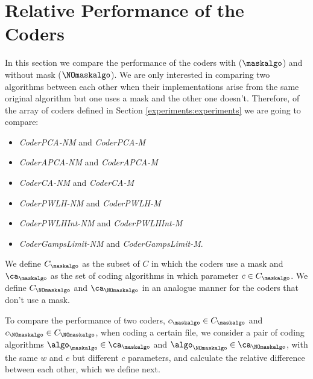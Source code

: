 \clearpage
\section{Relative Performance of the Coders}
\label{secX:rendimiento-relativo}

In this section we compare the performance of the coders with ($\maskalgo$) and without mask ($\NOmaskalgo$). We are only interested in comparing two algorithms between each other when their implementations arise from the same original algorithm but one uses a mask and the other one doesn't. Therefore, of the array of coders defined in Section \ref{experiments:experiments} we are going to compare:

\vspace{-8pt}
\begin{itemize}
    \item \textit{CoderPCA-NM} and \textit{CoderPCA-M}
    \item \textit{CoderAPCA-NM} and \textit{CoderAPCA-M}
    \item \textit{CoderCA-NM} and \textit{CoderCA-M}
    \item \textit{CoderPWLH-NM} and \textit{CoderPWLH-M}
    \item \textit{CoderPWLHInt-NM} and \textit{CoderPWLHInt-M}
    \item \textit{CoderGampsLimit-NM} and \textit{CoderGampsLimit-M}.
\end{itemize}

\vspace{+5pt}
\begin{defcion}
We define $C_\maskalgo$ as the subset of $C$ in which the coders use a mask and ${\ca}_\maskalgo$ as the set of coding algorithms in which parameter $c \in C_\maskalgo$. We define $C_\NOmaskalgo$ and ${\ca}_\NOmaskalgo$ in an analogue manner for the coders that don't use a mask.
\end{defcion}

To compare the performance of two coders, $c_\maskalgo \in C_\maskalgo$ and $c_\NOmaskalgo \in C_\NOmaskalgo$, when coding a certain file, we consider a pair of coding algorithms $\algo_\maskalgo \in {\ca}_\maskalgo$ and $\algo_\NOmaskalgo \in {\ca}_\NOmaskalgo$, with the same $w$ and $e$ but different $c$ parameters, and calculate the relative difference between each other, which we define next.

